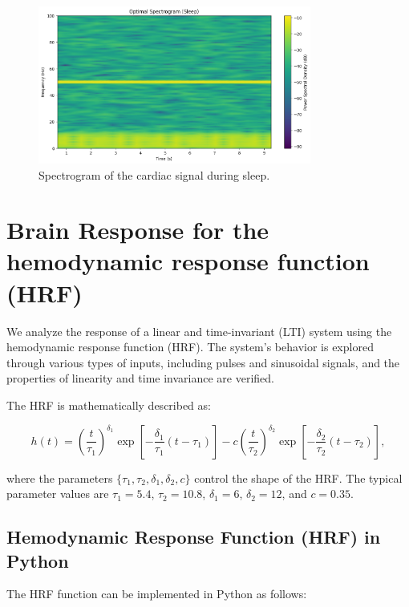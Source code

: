 \documentclass[10pt]{article}
\theoremstyle{definition}
\theoremstyle{remark}
\theoremstyle{definition}
\numberwithin{equation}{prob}
\begin{document}
\begin{figure}[H]
    \centering
    \includegraphics[width=0.8\textwidth]{./figures/Optimal Spectrogram Sleep.png}
    \caption{Spectrogram of the cardiac signal during sleep.}
\end{figure}


\section{Brain Response for the hemodynamic response function (HRF)}

We analyze the response of a linear and time-invariant (LTI) system using the hemodynamic response function (HRF). The system’s behavior is explored through various types of inputs, including pulses and sinusoidal signals, and the properties of linearity and time invariance are verified.

The HRF is mathematically described as:

\begin{equation}
h(t) = \left( \frac{t}{\tau_1} \right)^{\delta_1} \exp\left[ -\frac{\delta_1}{\tau_1} (t-\tau_1) \right] - c \left( \frac{t}{\tau_2} \right)^{\delta_2} \exp\left[ -\frac{\delta_2}{\tau_2} (t-\tau_2) \right],
\end{equation}

where the parameters $\{\tau_1,\tau_2,\delta_1,\delta_2,c\}$ control the shape of the HRF. The typical parameter values are $\tau_1=5.4$, $\tau_2=10.8$, $\delta_1=6$, $\delta_2=12$, and $c=0.35$.

\subsection{Hemodynamic Response Function (HRF) in Python}

The HRF function can be implemented in Python as follows:
\end{document}
